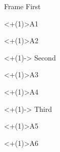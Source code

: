 \documentclass{beamer}
\begin{document}
\begin{frame}{Frame}
First

\alert<+(1)>{A1}

\alert<+(1)>{A2}

\begin{uncoverenv}<+(1)->
Second

\alert<+(1)>{A3}

\alert<+(1)>{A4}
\end{uncoverenv}

\begin{uncoverenv}<+(1)->
 Third

\alert<+(1)>{A5}

\alert<+(1)>{A6}
\end{uncoverenv}

\end{frame}
\end{document}
